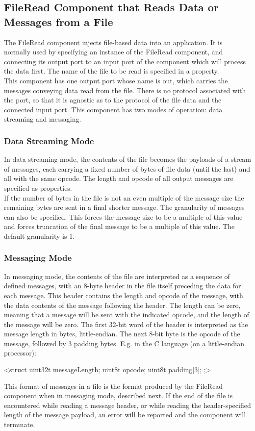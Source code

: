 \documentclass[10pt, a4paper, oneside]{article}
\renewcommand\_{\textunderscore\allowbreak} %
\begin{document}
\subsection{File\_Read Component that Reads Data or Messages from a File} The File\_Read component injects file-based data into an application.  It is normally used by specifying an instance of the File\_Read component, and connecting its output port to an input port of the component which will process the data first.  The name of the file to be read is specified in a property. \\

This component has one output port whose name is out, which carries the messages conveying data read from the file.  There is no protocol associated with the port, so that it is agnostic as to the protocol of the file data and the connected input port. This component has two modes of operation:  data streaming and messaging.
\subsubsection{Data Streaming Mode} In data streaming mode, the contents of the file becomes the payloads of a stream of messages, each carrying a fixed number of bytes of file data (until the last) and all with the same opcode.  The length and opcode of all output messages are specified as properties.\\

If the number of bytes in the file is not an even multiple of the message size the remaining bytes are sent in a final shorter message.  The granularity of messages can also be specified.  This forces the message size to be a multiple of this value and forces truncation of the final message to be a multiple of this value.  The default granularity is 1.
\subsubsection{Messaging Mode} In messaging mode, the contents of the file are interpreted as a sequence of defined messages, with an 8-byte header in the file itself preceding the data for each message. This header contains the length and opcode of the message, with the data contents of the message following the header.  The length can be zero, meaning that a message will be sent with the indicated opcode, and the length of the message will be zero.
The first 32-bit word of the header is interpreted as the message length in bytes, little-endian.  The next 8-bit byte is the opcode of the message, followed by 3 padding bytes. 
E.g. in the C language (on a little-endian processor):\begin{ocpixml}
<struct {
 uint32\_t messageLength;
 uint8\_t  opcode;
 uint8\_t  padding[3];
    };>\end{ocpixml}
This format of messages in a file is the format produced by the File\_Read component when in messaging mode, described next. If the end of the file is encountered while reading a message header, or while reading the header-specified length of the message payload, an error will be reported and the component will terminate.
\end{document}
